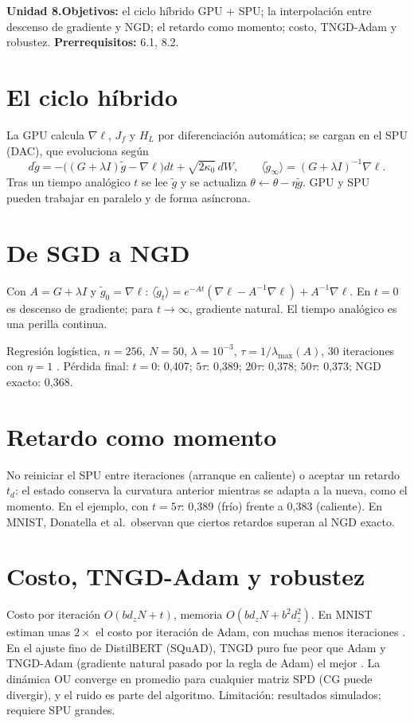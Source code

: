 \documentclass[11pt,a4paper]{article}
\begin{document}

\noindent\textbf{Unidad 8.}\quad\textbf{Objetivos:} el ciclo híbrido GPU + SPU; la interpolación entre descenso de gradiente y NGD; el retardo como momento;
costo, TNGD-Adam y robustez.
\textbf{Prerrequisitos:} 6.1, 8.2.

\section{El ciclo híbrido}
La GPU calcula $\nabla\ell$, $J_f$ y $H_L$ por diferenciación automática; se cargan en el SPU (DAC), que evoluciona según
\[d\tilde g=-\big((G+\lambda I)\tilde g-\nabla\ell\big)dt+\sqrt{2\kappa_0}\,dW,\qquad\langle\tilde g_\infty\rangle=(G+\lambda I)^{-1}\nabla\ell.\]
Tras un tiempo analógico $t$ se lee $\tilde g$ y se actualiza $\theta\leftarrow\theta-\eta\tilde g$. GPU y SPU pueden trabajar en paralelo y de forma asíncrona.

\section{De SGD a NGD}
Con $A=G+\lambda I$ y $\tilde g_0=\nabla\ell$: $\langle\tilde g_t\rangle=e^{-At}(\nabla\ell-A^{-1}\nabla\ell)+A^{-1}\nabla\ell$. En $t=0$ es descenso de gradiente; para
$t\to\infty$, gradiente natural. El tiempo analógico es una perilla continua.
\begin{ejemplo}
Regresión logística, $n=256$, $N=50$, $\lambda=10^{-3}$, $\tau=1/\lambda_{\max}(A)$, 30 iteraciones con $\eta=1$ \evS. Pérdida final: $t=0$: 0,407; $5\tau$: 0,389;
$20\tau$: 0,378; $50\tau$: 0,373; NGD exacto: 0,368.
\end{ejemplo}

\section{Retardo como momento}
No reiniciar el SPU entre iteraciones (arranque en caliente) o aceptar un retardo $t_d$: el estado conserva la curvatura anterior mientras se adapta a la nueva, como
el momento. En el ejemplo, con $t=5\tau$: 0,389 (frío) frente a 0,383 (caliente). En MNIST, Donatella et al.\ observan que ciertos retardos superan al NGD exacto.

\section{Costo, TNGD-Adam y robustez}
Costo por iteración $O(bd_zN+t)$, memoria $O(bd_zN+b^2d_z^2)$. En MNIST estiman unas $2\times$ el costo por iteración de Adam, con muchas menos iteraciones \evS.
En el ajuste fino de DistilBERT (SQuAD), TNGD puro fue peor que Adam y TNGD-Adam (gradiente natural pasado por la regla de Adam) el mejor \evS. La dinámica OU
converge en promedio para cualquier matriz SPD (CG puede divergir), y el ruido es parte del algoritmo. Limitación: resultados simulados; requiere SPU grandes.
\end{document}
